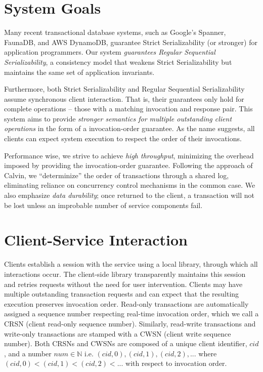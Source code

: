 \documentclass{article}
\begin{document}
\section{System Goals}
\par Many recent transactional database systems, such as Google's Spanner, FaunaDB, and AWS DynamoDB, guarantee Strict Serializability (or stronger) for application programmers. Our system \emph{guarantees Regular Sequential Serializability}, a consistency model that weakens Strict Serializability but maintains the same set of application invariants.
\par Furthermore, both Strict Serializability and Regular Sequential Serializability assume synchronous client interaction. That is, their guarantees only hold for complete operations -- those with a matching invocation and response pair. This system aims to provide \emph{stronger semantics for multiple outstanding client operations} in the form of a invocation-order guarantee. As the name suggests, all clients can expect system execution to respect the order of their invocations. 
\par Performance wise, we strive to achieve \emph{high throughput}, minimizing the overhead imposed by providing the invocation-order guarantee. Following the approach of Calvin, we ``determinize'' the order of transactions through a shared log, eliminating reliance on concurrency control mechanisms in the common case. We also emphasize \emph{data durability}; once returned to the client, a transaction will not be lost unless an improbable number of service components fail. 

\section{Client-Service Interaction}
\par Clients establish a session with the service using a local library, through which all interactions occur. The client-side library transparently maintains this session and retries requests without the need for user intervention. Clients may have multiple outstanding transaction requests and can expect that the resulting execution preserves invocation order. Read-only transactions are automatically assigned a sequence number respecting real-time invocation order, which we call a CRSN (client read-only sequence number). Similarly, read-write transactions and write-only transactions are stamped with a CWSN (client write sequence number). Both CRSNs and CWSNs are composed of a unique client identifier, $cid$, and a number $num \in \mathbb{N}$ i.e. $(cid, 0), (cid, 1), (cid, 2),...$ where $(cid, 0) < (cid, 1) < (cid, 2) < ...$ with respect to invocation order.
\end{document}
